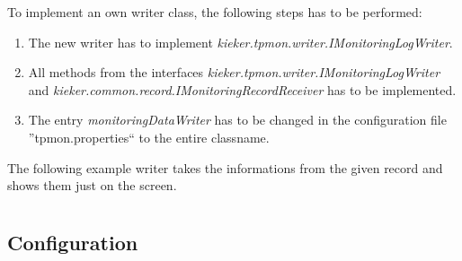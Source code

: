 \documentclass[a4paper, oneside, 11pt]{scrartcl}
\begin{document}
To implement an own writer class, the following steps has to be performed:
\begin{enumerate}
 \item The new writer has to implement \textit{kieker.tpmon.writer.IMonitoringLogWriter}.
 \item All methods from the interfaces \textit{kieker.tpmon.writer.IMonitoringLogWriter} and \textit{kieker.common.record.IMonitoringRecordReceiver} has to be implemented.
 \item The entry \textit{monitoringDataWriter} has to be changed in the configuration file ''tpmon.properties`` to the entire classname.
\end{enumerate}
The following example writer takes the informations from the given record and shows them just on the screen.
\setJavaCodeListing
\lstset{caption=OwnWriter.java, label=listing:OwnWriter.java}


\section{\KiekerAnalysis}
\subsection{Configuration}
\end{document}

